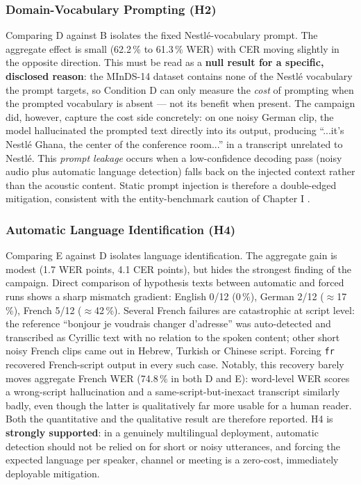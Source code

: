 \documentclass[12pt]{report}
\begin{document}
\subsubsection{Domain-Vocabulary Prompting (H2)}
Comparing D against B isolates the fixed Nestl\'e-vocabulary prompt. The aggregate effect is small (62.2\,\% to 61.3\,\% WER) with CER moving slightly in the opposite direction. This must be read as a \textbf{null result for a specific, disclosed reason}: the MInDS-14 dataset contains none of the Nestl\'e vocabulary the prompt targets, so Condition D can only measure the \emph{cost} of prompting when the prompted vocabulary is absent --- not its benefit when present. The campaign did, however, capture the cost side concretely: on one noisy German clip, the model hallucinated the prompted text directly into its output, producing \enquote{...it's Nestl\'e Ghana, the center of the conference room...} in a transcript unrelated to Nestl\'e. This \emph{prompt leakage} occurs when a low-confidence decoding pass (noisy audio plus automatic language detection) falls back on the injected context rather than the acoustic content. Static prompt injection is therefore a double-edged mitigation, consistent with the entity-benchmark caution of Chapter I \cite{durmus2026contextual}.
\subsubsection{Automatic Language Identification (H4)}
Comparing E against D isolates language identification. The aggregate gain is modest (1.7 WER points, 4.1 CER points), but hides the strongest finding of the campaign. Direct comparison of hypothesis texts between automatic and forced runs shows a sharp mismatch gradient: English 0/12 (0\,\%), German 2/12 ($\approx$17\,\%), French 5/12 ($\approx$42\,\%). Several French failures are catastrophic at script level: the reference \enquote{bonjour je voudrais changer d'adresse} was auto-detected and transcribed as Cyrillic text with no relation to the spoken content; other short noisy French clips came out in Hebrew, Turkish or Chinese script. Forcing \texttt{fr} recovered French-script output in every such case. Notably, this recovery barely moves aggregate French WER (74.8\,\% in both D and E): word-level WER scores a wrong-script hallucination and a same-script-but-inexact transcript similarly badly, even though the latter is qualitatively far more usable for a human reader. Both the quantitative and the qualitative result are therefore reported. H4 is \textbf{strongly supported}: in a genuinely multilingual deployment, automatic detection should not be relied on for short or noisy utterances, and forcing the expected language per speaker, channel or meeting is a zero-cost, immediately deployable mitigation.
\end{document}
